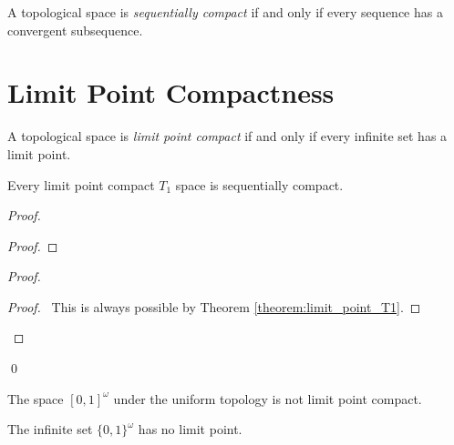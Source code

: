 \begin{definition}
    A topological space is \emph{sequentially compact} if and only if
    every sequence has a convergent subsequence.
\end{definition}

\section{Limit Point Compactness}

\begin{definition}
    A topological space is \emph{limit point compact} if and only if every
    infinite set has a limit point.
\end{definition}

\begin{proposition}
    \label{proposition:limit_point_compact_sequentially_compact}
    Every limit point compact $T_1$ space is sequentially compact.
\end{proposition}

\begin{proof}
    \pf
    \begin{proof}
    \end{proof}
    \begin{proof}
        \begin{proof}
            \pf\ This is always possible by Theorem \ref{theorem:limit_point_T1}.
        \end{proof}
    \end{proof}
    \qed
\end{proof}

\begin{example}
    The space $[0,1]^\omega$ under the uniform topology is not limit point compact.

    The infinite set $\{0,1\}^\omega$ has no limit point.
\end{example}

